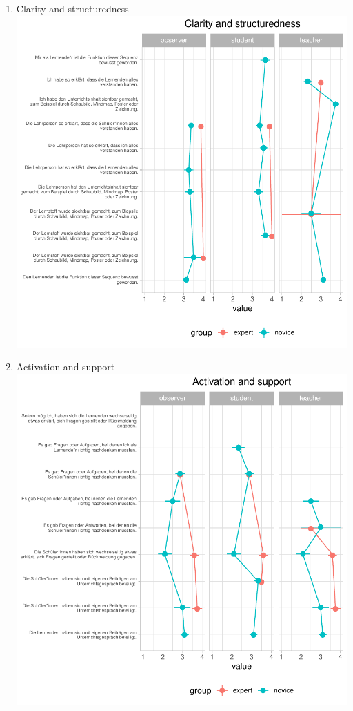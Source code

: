 \documentclass[
  english,
  man,floatsintext]{apa6}
\begin{document}
\begin{enumerate}
  \newpage
\item
  Clarity and structuredness
  \includegraphics{paper_1_supplement_files/figure-latex/Clarity and structuredness line plots-1.pdf}
  \newpage
\item
  Activation and support
  \includegraphics{paper_1_supplement_files/figure-latex/Activation and support line plots-1.pdf}
  \newpage
\end{enumerate}
\end{document}
